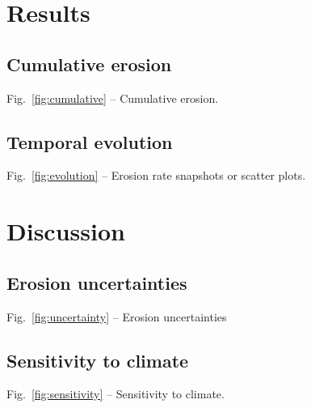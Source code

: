 \documentclass[utf8]{article}
\begin{document}
\section{Results}

\subsection{Cumulative erosion}

    Fig.~\ref{fig:cumulative} -- Cumulative erosion.

\subsection{Temporal evolution}

    Fig.~\ref{fig:evolution} -- Erosion rate snapshots or scatter plots.

\section{Discussion}

\subsection{Erosion uncertainties}

    Fig.~\ref{fig:uncertainty} -- Erosion uncertainties

\subsection{Sensitivity to climate}

    Fig.~\ref{fig:sensitivity} -- Sensitivity to climate.
\end{document}
